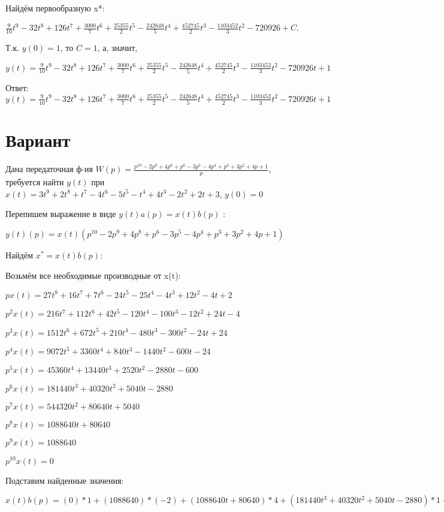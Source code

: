 \documentclass{article}
\begin{document}
{{{Найдём первообразную x*:

$\frac{9}{10}t^{9}-32t^{8}+126t^{7}+\frac{3000}{7}t^{6}+\frac{25355}{2}t^{5}-\frac{242648}{5}t^{4}+\frac{452745}{2}t^{3}-\frac{1103452}{3}t^{2}-720926+C.$

Т.к. $y(0)=1$, то $C=1$, а, значит, 

$y(t)=\frac{9}{10}t^{9}-32t^{8}+126t^{7}+\frac{3000}{7}t^{6}+\frac{25355}{2}t^{5}-\frac{242648}{5}t^{4}+\frac{452745}{2}t^{3}-\frac{1103452}{3}t^{2}-720926t+1$

Ответ: $y(t) = \frac{9}{10}t^{9}-32t^{8}+126t^{7}+\frac{3000}{7}t^{6}+\frac{25355}{2}t^{5}-\frac{242648}{5}t^{4}+\frac{452745}{2}t^{3}-\frac{1103452}{3}t^{2}-720926t+1$

\section{Вариант}

Дана передаточная ф-ия $W(p)=\frac{p^{10}-2p^{9}+4p^{8}+p^{6}-3p^{5}-4p^{4}+p^{3}+3p^{2}+4p+1}{p}$, требуется найти $y(t)$ при $x(t)=3t^{9}+2t^{8}+t^{7}-4t^{6}-5t^{5}-t^{4}+4t^{3}-2t^{2}+2t+3$, $y(0)=0$

Перепишем выражение в виде $y(t)a(p)=x(t)b(p)$ :

$y(t)(p)=x(t)(p^{10}-2p^{9}+4p^{8}+p^{6}-3p^{5}-4p^{4}+p^{3}+3p^{2}+4p+1)$

Найдём $x^*=x(t)b(p)$:

Возьмём все необходимые производные от x(t):

$px(t)=27t^{8}+16t^{7}+7t^{6}-24t^{5}-25t^{4}-4t^{3}+12t^{2}-4t+2$

$p^2x(t)=216t^{7}+112t^{6}+42t^{5}-120t^{4}-100t^{3}-12t^{2}+24t-4$

$p^3x(t)=1512t^{6}+672t^{5}+210t^{4}-480t^{3}-300t^{2}-24t+24$

$p^4x(t)=9072t^{5}+3360t^{4}+840t^{3}-1440t^{2}-600t-24$

$p^5x(t)=45360t^{4}+13440t^{3}+2520t^{2}-2880t-600$

$p^6x(t)=181440t^{3}+40320t^{2}+5040t-2880$

$p^7x(t)=544320t^{2}+80640t+5040$

$p^8x(t)=1088640t+80640$

$p^9x(t)=1088640$

$p^10x(t)=0$

Подставим найденные значения:

$x(t)b(p) = (0)*1+(1088640)*(-2)+(1088640t+80640)*4+(181440t^{3}+40320t^{2}+5040t-2880)*1+(45360t^{4}+13440t^{3}+2520t^{2}-2880t-600)*(-3)+(9072t^{5}+3360t^{4}+840t^{3}-1440t^{2}-600t-24)*(-4)+(1512t^{6}+672t^{5}+210t^{4}-480t^{3}-300t^{2}-24t+24)*1+(216t^{7}+112t^{6}+42t^{5}-120t^{4}-100t^{3}-12t^{2}+24t-4)*3+(27t^{8}+16t^{7}+7t^{6}-24t^{5}-25t^{4}-4t^{3}+12t^{2}-4t+2)*4+(27t^{8}+16t^{7}+7t^{6}-24t^{5}-25t^{4}-4t^{3}+12t^{2}-4t+2)*1=135t^{8}+728t^{7}+1883t^{6}-35610t^{5}-149795t^{4}+136960t^{3}+38244t^{2}+4370668t$





}}}
\end{document}
